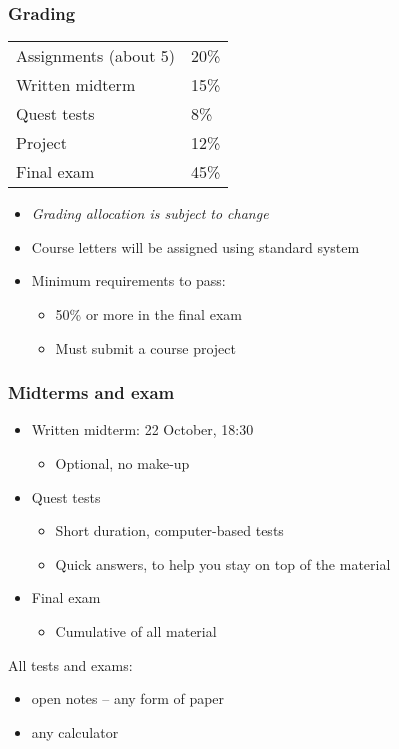 \begin{frame}\frametitle{Grading}
	\begin{tabular}{ll}\\
		Assignments (about 5)       	& 20\% \\
	    Written midterm        			& 15\% \\
	    Quest tests						& 8\% \\
	    Project      					& 12\% \\
	    Final exam 						& 45\% \\
	\end{tabular}

	\vspace{12pt}
	\vspace{12pt}

	\begin{itemize}
		\item	\emph{Grading allocation is subject to change}
		\item	Course letters will be assigned using standard system
		\item	Minimum requirements to pass:
		\begin{itemize}
			\item	50\% or more in the final exam
			\item	Must submit a course project
		\end{itemize}
	\end{itemize}
\end{frame}

\begin{frame}\frametitle{Midterms and exam}
	\begin{itemize}
		\item	Written midterm: 22 October, 18:30
		\begin{itemize}
			\item	Optional, no make-up
		\end{itemize}

		\item	Quest tests
		\begin{itemize}
			\item	Short duration, computer-based tests
			\item	Quick answers, to help you stay on top of the material
		\end{itemize}

		\item	Final exam
		\begin{itemize}
			\item	Cumulative of all material
		\end{itemize}
	\end{itemize}

	\vspace{12pt}
	All tests and exams:
	\begin{itemize}
		\item	open notes -- any form of paper
		\item	any calculator
	\end{itemize}
\end{frame}

